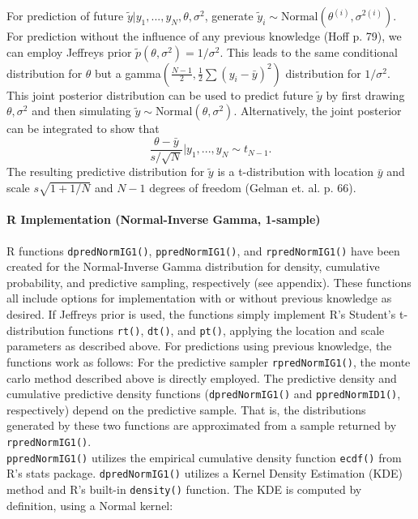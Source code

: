 \documentclass[12pt, a4paper]{article}
\begin{document}
\noindent For prediction of future $\tilde{y}|y_1,...,y_N,\theta,\sigma^2$, generate $\tilde{y}_i \sim \text{Normal}\left(\theta^{(i)},\sigma^{2(i)}\right)$.\\

\noindent For prediction without the influence of any previous knowledge (Hoff p. 79), we can employ Jeffreys prior $\tilde{p}\left(\theta,\sigma^2\right) = 1/\sigma^2$.  This leads to the same conditional distribution for $\theta$ but a gamma$\left(\frac{N-1}{2},\frac{1}{2}\sum\left(y_i - \bar{y}\right)^2\right)$ distribution for $1/\sigma^2$.  This joint posterior distribution can be used to predict future $\tilde{y}$ by first drawing $\theta,\sigma^2$ and then simulating $\tilde{y}\sim\text{Normal}\left(\theta,\sigma^2\right)$.   Alternatively, the joint posterior can be integrated to show that
        $$\dfrac{\theta-\bar{y}}{s/\sqrt{N}}|y_1,...,y_N\sim t_{N-1}.$$
\noindent The resulting predictive distribution for $\tilde{y}$ is a t-distribution with location $\bar{y}$ and scale $s\sqrt{1+1/N}$ and $N-1$ degrees of freedom (Gelman et. al. p. 66).


      \paragraph{R Implementation (Normal-Inverse Gamma, 1-sample)}
      R functions \texttt{dpredNormIG1()}, \texttt{ppredNormIG1()}, and \texttt{rpredNormIG1()} have been created for the Normal-Inverse Gamma distribution for density, cumulative probability, and predictive sampling, respectively (see appendix).  These functions all include options for implementation with or without previous knowledge as desired.  If Jeffreys prior is used, the functions simply implement R's Student's t-distribution functions \texttt{rt()}, \texttt{dt()}, and \texttt{pt()}, applying the location and scale parameters as described above.  For predictions using previous knowledge, the functions work as follows:  For the predictive sampler \texttt{rpredNormIG1()}, the monte carlo method described above is directly employed.  The predictive density and cumulative predictive density functions (\texttt{dpredNormIG1()} and \texttt{ppredNormID1()}, respectively) depend on the predictive sample. That is, the distributions generated by these two functions are approximated from a sample returned by \texttt{rpredNormIG1()}.\\

\noindent\texttt{ppredNormIG1()} utilizes the empirical cumulative density function \texttt{ecdf()} from R's stats package.  \texttt{dpredNormIG1()} utilizes a Kernel Density Estimation (KDE) method and R's built-in \texttt{density()} function.  The KDE is computed by definition, using a Normal kernel:
\end{document}
